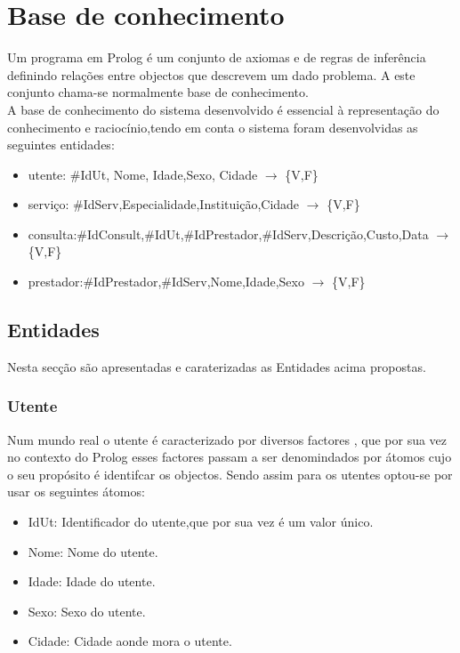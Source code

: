 \documentclass[25pt]{article}
\begin{document}
\section{Base de conhecimento}
Um programa em Prolog é um conjunto de axiomas e de regras de inferência definindo relações entre objectos que descrevem
um dado problema. A este conjunto chama-se normalmente base de conhecimento.\\
A base de conhecimento do sistema desenvolvido é essencial à representação do conhecimento e raciocínio,tendo em conta o sistema
foram desenvolvidas as seguintes entidades:

\begin{itemize}
  \item utente: \#IdUt, Nome, Idade,Sexo, Cidade $\to$ \{V,F\}
  \item serviço: \#IdServ,Especialidade,Instituiç\~ao,Cidade $\to$ \{V,F\}
  \item consulta:\#IdConsult,\#IdUt,\#IdPrestador,\#IdServ,Descrição,Custo,Data $\to$ \{V,F\}
  \item prestador:\#IdPrestador,\#IdServ,Nome,Idade,Sexo $\to$ \{V,F\}
  
  \end{itemize}



\subsection{Entidades}
Nesta secção são apresentadas e caraterizadas as Entidades acima propostas.

\subsubsection{Utente}
Num mundo real o utente é caracterizado por diversos factores , que por sua vez no contexto do Prolog esses factores passam a ser denomindados por átomos cujo o seu propósito é identifcar os objectos. Sendo assim para os utentes optou-se por usar os seguintes átomos:

 \begin{itemize}
  \item IdUt: Identificador do utente,que por sua vez é um valor único.
  \item Nome: Nome do utente.
  \item Idade: Idade do utente.
  \item Sexo: Sexo do utente.
  \item Cidade: Cidade aonde mora o utente.
\end{itemize}
\end{document}

